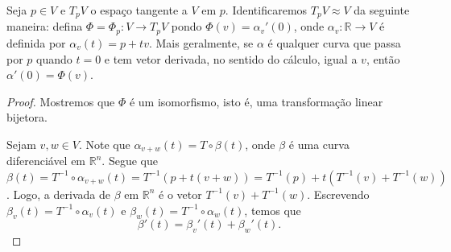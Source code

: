 \fi

\begin{lemma}
	\label{lem:espaco-tangente-espaco-vetorial}
	Seja $p \in V$ e $T_{p}V$ o espaço tangente a $V$ em $p$. Identificaremos $T_{p}V \approx V$ da seguinte maneira:
	defina $\Phi=\Phi_{p}:V\to T_{p}V$ pondo $\Phi(v)=\alpha_{v}'(0)$, onde $\alpha_{v}:\mathbb{R}\to V$ é definida por $\alpha_{v}(t)=p+tv$. Mais geralmente, se $\alpha$ é qualquer curva que passa por $p$ quando $t=0$ e tem vetor derivada, no sentido do cálculo, igual a $v$, então $\alpha'(0)=\Phi(v)$.
	\begin{proof}

		Mostremos que $\Phi$ é um isomorfismo, isto é, uma transformação linear bijetora.

		Sejam $v ,w \in V$. Note que $\alpha_{v+w}(t)=T \circ \beta(t)$, onde $\beta$ é uma curva diferenciável em $\mathbb{R}^{n}$.
		Segue que $\beta(t)=T^{-1} \circ\alpha_{v+w}(t)=T^{-1}(p + t(v+w))=T^{-1}(p)+t(T^{-1}(v)+T^{-1}(w))$. Logo, a derivada de $\beta$ em $\mathbb{R}^{n}$ é o vetor $T^{-1}(v)+T^{-1}(w)$.
		Escrevendo $\beta_{v}(t)=T^{-1}\circ\alpha_{v}(t)$ e $\beta_{w}(t)=T^{-1} \circ \alpha_{w}(t)$, temos que
		\begin{equation*}
			\beta'(t)=\beta_{v}'(t)+\beta_{w}'(t).
		\end{equation*}


\end{proof}
\end{lemma}
